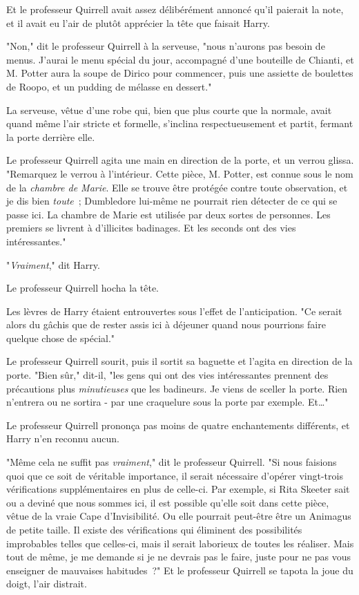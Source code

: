 Et le professeur Quirrell avait assez délibérément annoncé qu'il paierait la note, et il avait eu l'air de plutôt apprécier la tête que faisait Harry.

"Non," dit le professeur Quirrell à la serveuse, "nous n'aurons pas besoin de menus. J'aurai le menu spécial du jour, accompagné d'une bouteille de Chianti, et M. Potter aura la soupe de Dirico pour commencer, puis une assiette de boulettes de Roopo, et un pudding de mélasse en dessert."

La serveuse, vêtue d’une robe qui, bien que plus courte que la normale, avait quand même l'air stricte et formelle, s'inclina respectueusement et partit, fermant la porte derrière elle.

Le professeur Quirrell agita une main en direction de la porte, et un verrou glissa. "Remarquez le verrou à l'intérieur. Cette pièce, M. Potter, est connue sous le nom de la \emph{chambre de Marie}. Elle se trouve être protégée contre toute observation, et je dis bien \emph{toute}~; Dumbledore lui-même ne pourrait rien détecter de ce qui se passe ici. La chambre de Marie est utilisée par deux sortes de personnes. Les premiers se livrent à d'illicites badinages. Et les seconds ont des vies intéressantes."

"\emph{Vraiment}," dit Harry.

Le professeur Quirrell hocha la tête.

Les lèvres de Harry étaient entrouvertes sous l'effet de l'anticipation. "Ce serait alors du gâchis que de rester assis ici à déjeuner quand nous pourrions faire quelque chose de spécial."

Le professeur Quirrell sourit, puis il sortit sa baguette et l'agita en direction de la porte. "Bien sûr," dit-il, "les gens qui ont des vies intéressantes prennent des précautions plus \emph{minutieuses} que les badineurs. Je viens de sceller la porte. Rien n'entrera ou ne sortira - par une craquelure sous la porte par exemple. Et…"

Le professeur Quirrell prononça pas moins de quatre enchantements différents, et Harry n'en reconnu aucun.

"Même cela ne suffit pas \emph{vraiment}," dit le professeur Quirrell. "Si nous faisions quoi que ce soit de véritable importance, il serait nécessaire d'opérer vingt-trois vérifications supplémentaires en plus de celle-ci. Par exemple, si Rita Skeeter sait ou a deviné que nous sommes ici, il est possible qu'elle soit dans cette pièce, vêtue de la vraie Cape d'Invisibilité. Ou elle pourrait peut-être être un Animagus de petite taille. Il existe des vérifications qui éliminent des possibilités improbables telles que celles-ci, mais il serait laborieux de toutes les réaliser. Mais tout de même, je me demande si je ne devrais pas le faire, juste pour ne pas vous enseigner de mauvaises habitudes~?" Et le professeur Quirrell se tapota la joue du doigt, l'air distrait.

